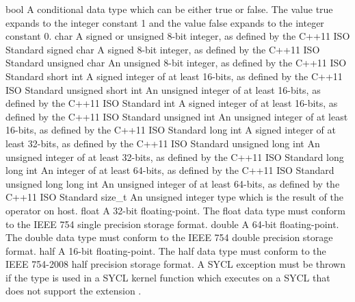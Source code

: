 \addRow
{
  bool
}
{
  A conditional data type which can be either true or false. The value
  true expands to the integer constant 1 and the value false expands to the
  integer constant 0.
}
\addRow
{
  char
}
{
  A signed or unsigned 8-bit integer, as defined by the C++11 ISO Standard
}
\addRow
{
  signed char
}
{
  A signed 8-bit integer, as defined by the C++11 ISO Standard
}
\addRow
{
  unsigned char
}
{
  An unsigned 8-bit integer, as defined by the C++11 ISO Standard
}
\addRow
{
  short int
}
{
  A signed integer of at least 16-bits, as defined by the C++11 ISO Standard
}
\addRow
{
  unsigned short int
}
{
  An unsigned integer of at least 16-bits, as defined by the C++11 ISO Standard
}
\addRow
{
  int
}
{
  A signed integer of at least 16-bits, as defined by the C++11 ISO Standard
}
\addRow
{
  unsigned int
}
{
  An unsigned integer of at least 16-bits, as defined by the C++11 ISO Standard
}
\addRow
{
  long int
}
{
  A signed integer of at least 32-bits, as defined by the C++11 ISO Standard
}
\addRow
{
  unsigned long int
}
{
  An unsigned integer of at least 32-bits, as defined by the C++11 ISO Standard
}
\addRow
{
  long long int
}
{
  An integer of at least 64-bits, as defined by the C++11 ISO Standard
}
\addRow
{
  unsigned long long int
}
{
  An unsigned integer of at least 64-bits, as defined by the C++11 ISO Standard
}
\addRow
{
  size_t
}
{
  An unsigned integer type which is the result of the 
  operator on host.
}
\addRow
{
  float
}
{
  A 32-bit floating-point. The float data type must conform to the IEEE 754
  single precision storage format.
}
\addRow
{
 double
}
{
  A 64-bit floating-point. The double data type must conform to the IEEE 754
  double precision storage format.
}
\addRow
{
  half
}
{
  A 16-bit floating-point. The half data type must conform to the IEEE 754-2008
  half precision storage format. A SYCL 
  exception must be thrown if the  type is used in a SYCL
  kernel function which executes on a SYCL  that does not
  support the extension .
}
\completeTable


